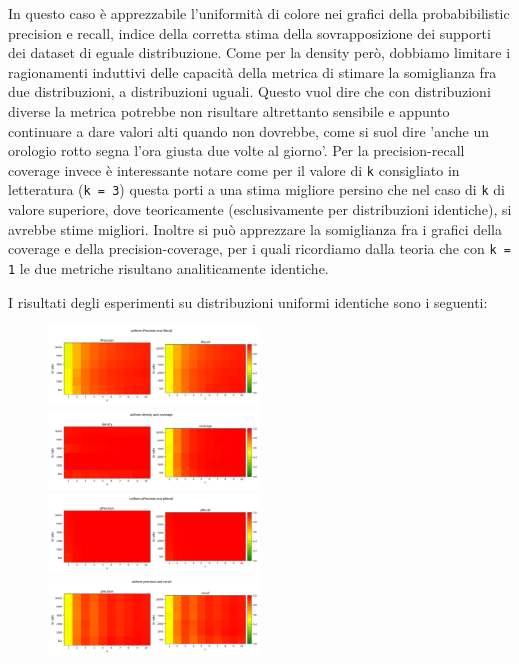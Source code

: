 In questo caso è apprezzabile l'uniformità di colore nei grafici della probabibilistic precision e recall, indice della corretta stima della sovrapposizione dei supporti dei dataset di eguale distribuzione.
Come per la density però, dobbiamo limitare i ragionamenti induttivi delle capacità della metrica di stimare la somiglianza fra due distribuzioni, a distribuzioni uguali. Questo vuol dire che con distribuzioni diverse la metrica potrebbe non risultare altrettanto sensibile e appunto continuare a dare valori alti quando non dovrebbe,
come si suol dire 'anche un orologio rotto segna l'ora giusta due volte al giorno'. Per la precision-recall coverage invece è interessante notare come per il valore di \texttt{k} consigliato in letteratura (\texttt{k = 3}) questa porti a una stima migliore persino che nel caso di \texttt{k} di valore superiore, dove teoricamente (esclusivamente per distribuzioni identiche), si avrebbe stime migliori. 
Inoltre si può apprezzare la somiglianza fra i grafici della coverage e della precision-coverage, per i quali ricordiamo dalla teoria che con \texttt{k = 1} le due metriche risultano analiticamente identiche.

I risultati degli esperimenti su distribuzioni uniformi identiche sono i seguenti:

\begin{figure}[!ht]
    \includegraphics[width=0.5\textwidth]{../images/toyexperiments/kdim/uniform_iPrecision_iRecall.png} 
    \includegraphics[width=0.5\textwidth]{../images/toyexperiments/kdim/uniform_density_coverage.png} 
    \includegraphics[width=0.5\textwidth]{../images/toyexperiments/kdim/uniform_pPrecision_pRecall.png}
    \includegraphics[width=0.5\textwidth]{../images/toyexperiments/kdim/uniform_precision_recall.png} 
\end{figure}

